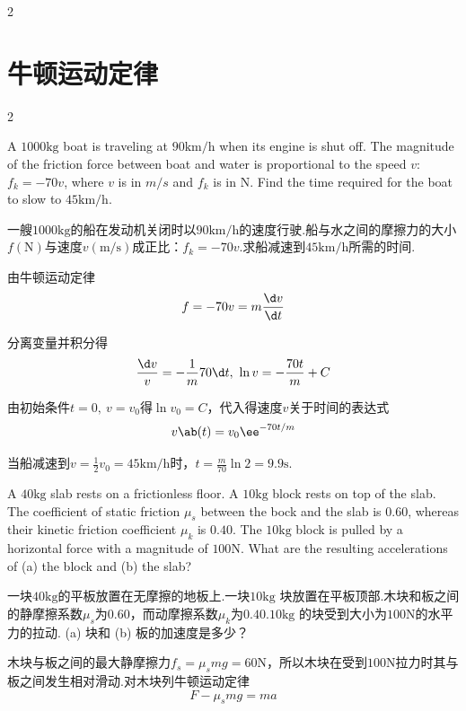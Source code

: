 {\begin{multicols}{2}
\begin{solution}
\centering
{}
\end{solution}
\end{multicols}
}

\newpage
\section{牛顿运动定律}
\begin{multicols}{2}
{
\begin{problem}
    A $1000\mathrm{kg}$ boat is traveling at $90\mathrm{km/h}$ when its engine is shut off. The magnitude of the friction force between boat and water is proportional to the speed $v$: $f_k=-70v$, where $v$ is in $m/s$ and $f_k$ is in $\mathrm{N}$. Find the time required for the boat to slow to $45\mathrm{km/h}$.
\end{problem}
\begin{translation}
    一艘$1000\mathrm{kg}$的船在发动机关闭时以$90\mathrm{km/h}$的速度行驶.船与水之间的摩擦力的大小$f(\mathrm{N})$与速度$v(\mathrm{m/s})$成正比：$f_k=-70v$.求船减速到$45\mathrm{km/h}$所需的时间.
\end{translation}
\begin{solution}
    由牛顿运动定律
    $$f=-70v=m\frac{\d v}{\d t}$$

    分离变量并积分得
    $$\frac{\d v}{v}=-\frac{1}{m}70\d t,\ \ln{v}=-\frac{70t}{m}+C$$

    由初始条件$t=0,\ v=v_0$得$\ln{v_0}=C$，代入得速度$v$关于时间的表达式
    $$v\ab(t)=v_0\ee^{-70t/m}$$

    当船减速到$v=\frac{1}{2}v_0=45\mathrm{km/h}$时，$t=\frac{m}{70}\ln{2}=9.9\mathrm{s}$.
\end{solution}

\begin{problem}
    A $40\mathrm{kg}$ slab rests on a frictionless floor. A $10\mathrm{kg}$ block rests on top of the slab. The coefficient of static friction $\mu_s$ between the bock and the slab is $0.60$, whereas their kinetic friction coefficient $\mu_k$ is $0.40$. The $10\mathrm{kg}$ block is pulled by a horizontal force with a magnitude of $100\mathrm{N}$. What are the resulting accelerations of (a) the block and (b) the slab?
\end{problem}
\begin{translation}
    一块$40\mathrm{kg}$的平板放置在无摩擦的地板上.一块$10\mathrm{kg}$ 块放置在平板顶部.木块和板之间的静摩擦系数$\mu_s$为$0.60$，而动摩擦系数$\mu_k$为$0.40$.$10\mathrm{kg}$ 的块受到大小为$100\mathrm{N}$的水平力的拉动. (a) 块和 (b) 板的加速度是多少？
\end{translation}
\begin{solution}
    木块与板之间的最大静摩擦力$f_s=\mu_smg=60\mathrm{N}$，所以木块在受到$100\mathrm{N}$拉力时其与板之间发生相对滑动.对木块列牛顿运动定律
    $$F-\mu_smg=ma$$
    

\end{solution}}
\end{multicols}
